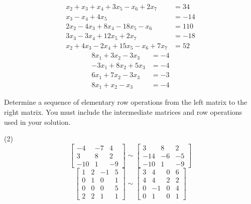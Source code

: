 \begin{tasks}[resume, style=enumerate]
\task \faCalculator
  \begin{align*}
    x_2 + x_3 + x_4 + 3x_5 - x_6 + 2x_7 &= 34 \\
    x_3 - x_4 + 4x_5 &= -14 \\
    2x_2 - 4x_3 + 8x_4 - 18x_5 - x_6 &= 110 \\
    3x_3 - 3x_4 + 12 x_5 + 2x_7 &= -18 \\
    x_2 + 4x_3 - 2x_4 + 15x_5 - x_6 + 7x_7 &= 52
  \end{align*}
\task \faCalculator
  \begin{align*}
    8x_1 + 3x_2 - 3x_3 &= -4 \\
    -3x_1 + 8x_2 + 5x_3 &= -4 \\
    6x_1 + 7x_2 - 3x_3 &= -3 \\
    8x_1 + x_2 - x_3 &= -4
  \end{align*}
\end{tasks}
Determine a sequence of elementary row operations from the left matrix
to the right matrix.  You must include the intermediate matrices and
row operations used in your solution.
\begin{tasks}[resume, style=enumerate](2)
\task
  \begin{displaymath}
    \begin{bmatrix}
      -4 & -7 & 4 \\
      3 & 8 & 2 \\
      -10 & 1 & -9
    \end{bmatrix}
    \sim
    \begin{bmatrix}
      3 & 8 & 2 \\
      -14 & -6 & -5 \\
      -10 & 1 & -9
    \end{bmatrix}
  \end{displaymath}
\task
  \begin{displaymath}
    \begin{bmatrix}
      1 & 2 & -1 & 5 \\
      0 & 1 & 0 & 1 \\
      0 & 0 & 0 & 5 \\
      2 & 2 & 1 & 1
    \end{bmatrix}
    \sim
    \begin{bmatrix}
      3 & 4 & 0 & 6 \\
      4 & 4 & 2 & 2 \\
      0 & -1 & 0 & 4 \\
      0 & 1 & 0 & 1
    \end{bmatrix}
  \end{displaymath}
\end{tasks}

